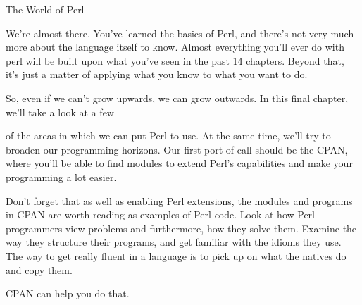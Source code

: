 \documentclass[a4paper,11pt]{book}
\begin{document}

\noindent 

\noindent 

\noindent 

\noindent 

\noindent 

\noindent 

\noindent 

\noindent 

\noindent 

\noindent 

\noindent 

\noindent 

\noindent 

\noindent 

\noindent 

\noindent The World of Perl

\noindent 

\noindent 

\noindent 

\noindent We're  almost there.  You've  learned  the  basics  of Perl,  and  there's  not very  much  more  about  the language  itself to  know.  Almost  everything  you'll  ever  do  with  perl  will  be  built  upon  what you've seen in the past 14 chapters.  Beyond  that,  it's  just  a  matter  of  applying  what  you  know  to  what you want to do.

\noindent 

\noindent So, even if we can't grow upwards, we can grow outwards. In this final chapter, we'll take a look at a few

\noindent of the areas in which we can put Perl to use. At the same time, we'll try to broaden our programming horizons. Our first port of call should be the CPAN, where you'll be able to find modules to extend Perl's capabilities and make your programming a lot easier.

\noindent 

\noindent Don't forget that as well as enabling Perl extensions, the modules and programs in CPAN are worth reading as examples of Perl code. Look at how Perl programmers view problems and furthermore, how they solve them. Examine the way they structure their programs, and get familiar with the idioms they use. The way to get really fluent in a language is to pick up on what the natives do and copy them.

\noindent CPAN can help you do that.
\end{document}
